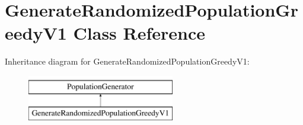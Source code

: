 \hypertarget{class_generate_randomized_population_greedy_v1}{\section{Generate\+Randomized\+Population\+Greedy\+V1 Class Reference}
\label{class_generate_randomized_population_greedy_v1}
}
Inheritance diagram for Generate\+Randomized\+Population\+Greedy\+V1\+:\begin{figure}[H]
\begin{center}
\leavevmode
\includegraphics[height=2.000000cm]{class_generate_randomized_population_greedy_v1}
\end{center}
\end{figure}
